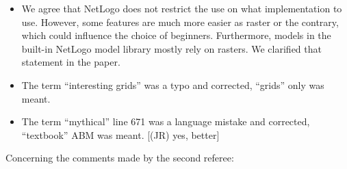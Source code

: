 \documentclass[11pt,a4paper,sans]{moderncv}        %
\begin{document}
\begin{itemize}
	
	
	\item We agree that NetLogo does not restrict the use on what implementation to use. However, some features are much more easier as raster or the contrary, which could influence the choice of beginners. Furthermore, models in the built-in NetLogo model library mostly rely on rasters. We clarified that statement in the paper.
	
	\item The term ``interesting grids'' was a typo and corrected, ``grids'' only was meant.
	
	\item The term ``mythical'' line 671 was a language mistake and corrected, ``textbook'' ABM was meant.
    [(JR) yes, better]
\end{itemize}




Concerning the comments made by the second referee:


\end{document}

